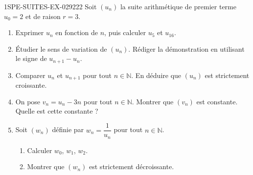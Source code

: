 \begin{exercice}{1SPE-SUITES-EX-029}{2}{22}
Soit $(u_n)$ la suite arithmétique de premier terme $u_0 = 2$ et de raison $r = 3$.

\begin{enumerate}
  \item Exprimer $u_n$ en fonction de $n$, puis calculer $u_5$ et $u_{16}$.

  \item Étudier le sens de variation de $(u_n)$. Rédiger la démonstration en utilisant le signe de $u_{n+1} - u_n$.

  \item Comparer $u_n$ et $u_{n+1}$ pour tout $n \in \mathbb{N}$. En déduire que $(u_n)$ est strictement croissante.

  \item On pose $v_n = u_n - 3n$ pour tout $n \in \mathbb{N}$. Montrer que $(v_n)$ est constante. Quelle est cette constante ?

  \item Soit $(w_n)$ définie par $w_n = \dfrac{1}{u_n}$ pour tout $n \in \mathbb{N}$.
  \begin{enumerate}
    \item Calculer $w_0$, $w_1$, $w_2$.
    \item Montrer que $(w_n)$ est strictement décroissante.
  \end{enumerate}
\end{enumerate}
\end{exercice}
